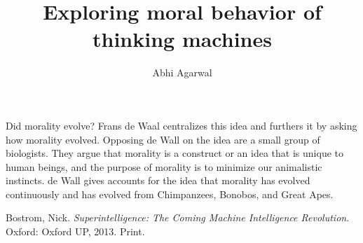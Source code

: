 \documentclass[11pt, oneside]{article}
\title{Exploring moral behavior of thinking machines}
\author{Abhi Agarwal}
\date{}
\begin{document}
\maketitle


\par Did morality evolve? Frans de Waal centralizes this idea and furthers it by asking how morality evolved. Opposing de Wall on the idea are a small group of biologists. They argue that morality is a construct or an idea that is unique to human beings, and the purpose of morality is to minimize our animalistic instincts. de Wall gives accounts for the idea that morality has evolved continuously and has evolved from Chimpanzees, Bonobos, and Great Apes.


\begin{thebibliography}{9}

  Bostrom, Nick. 
  \emph{Superintelligence: The Coming Machine Intelligence Revolution}.
  Oxford: Oxford UP, 2013. 
  Print.

\end{thebibliography}
\end{document}
